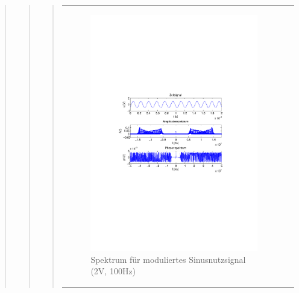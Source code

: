 \begin{quote}
\begin{quote}
\begin{quote}
\begin{center}
\begin{tabular}{ll}
\begin{minipage}{0.6\textwidth}
                \end{minipage}
                \begin{minipage}{0.6\textwidth}

                     \begin{figure}[H]
                        \label{fig:}
                        \includegraphics[scale=0.5, trim = 4cm 9.5cm 3.5cm
                        9.5cm, clip]{./Bilder/sin_a2_f100}
                        \caption{Spektrum für moduliertes Sinusnutzsignal (2V,
                        100Hz)}
                    \end{figure}
               \vspace{-1.5em}

                \end{minipage}


\end{tabular}
\end{center}
\end{quote}
\end{quote}
\end{quote}

